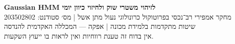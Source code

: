 \documentclass[11pt,a4paper]{article}
\newcommand{\inputsection}[1]{}
\begin{document}
\thispagestyle{empty}
\begin{center}
\vspace*{2.5cm}
{\sffamily\Huge\bfseries\color{academicblue}
Gaussian HMM לזיהוי משטרי שוק ולחיזוי כיוון יומי\\[0.5em]
}
\vspace{1.2cm}
{\sffamily\Large\color{deepnavy}
מחקר אמפירי רב־נכסי בפרוטוקול כרונולוגי נעול
}
\vspace{2cm}
{\sffamily\large
מתן אשל \quad | \quad מס׳ סטודנט: 203502802\\[0.5em]
שיטות מתקדמות בלמידת מכונה \quad | \quad אפקה — המכללה האקדמית להנדסה\\[0.5em]
\the\year
}
\vfill
{\small\color{mutedgray}
אין בדוח זה טענת רווחיות ואין לראות בו ייעוץ השקעות.
}
\end{center}
\clearpage

\tableofcontents
\clearpage

\setcounter{page}{1}

\inputsection{00_abstract}
\inputsection{01_intro}
\inputsection{02_data_protocol}
\inputsection{03_method}
\inputsection{04_experiments}
\inputsection{05_regime_results}
\inputsection{06_prediction_results}
\inputsection{07_discussion}
\inputsection{08_rl_future_work}
\inputsection{09_limitations_conclusion}
\inputsection{10_reproducibility}

\clearpage
{}


\end{document}

